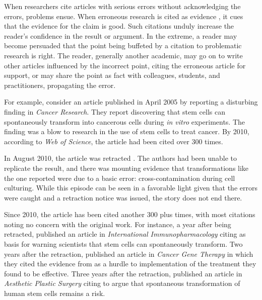 \documentclass[12pt, letterpaper]{article}
\begin{document}
When researchers cite articles with serious errors without acknowledging the errors, problems ensue. When erroneous research is cited as evidence \citep[e.g.,][]{chang2013safety, torsvik2010spontaneous}, it cues that the evidence for the claim is good. Such citations unduly increase the reader's confidence in the result or argument. In the extreme, a reader may become persuaded that the point being buffeted by a citation to problematic research is right. The reader, generally another academic, may go on to write other articles influenced by the incorrect point, citing the erroneous article for support, or may share the point as fact with colleagues, students, and practitioners, propagating the error.

For example, consider an article published in April 2005 by \citet{rubio2005spontaneous} reporting a disturbing finding in \textit{Cancer Research}. They report discovering that stem cells can spontaneously transform into cancerous cells during \textit{in vitro} experiments. The finding was a blow to research in the use of stem cells to treat cancer. By 2010, according to \textit{Web of Science}, the article had been cited over 300 times.

In August 2010, the article was retracted \citep{de2010retraction}. The authors had been unable to replicate the result, and there was mounting evidence that transformations like the one reported were due to a basic error: cross-contamination during cell culturing. While this episode can be seen in a favorable light given that the errors were caught and a retraction notice was issued, the story does not end there.

Since 2010, the article has been cited another 300 plus times, with most citations noting no concern with the original work. For instance, a year after being retracted, \citet{firinci2011mesenchymal} published an article in \textit{International Immunopharmacology} citing \citeauthor{rubio2005spontaneous} as basis for warning scientists that stem cells can spontaneously transform. Two years after the retraction, \citet{kosaka2012therapeutic} published an article in \textit{Cancer Gene Therapy} in which they cited the evidence from \citeauthor{rubio2005spontaneous} as a hurdle to implementation of the treatment they found to be effective. Three years after the retraction, \citet{chang2013safety} published an article in \textit{Aesthetic Plastic Surgery} citing \citeauthor{rubio2005spontaneous} to argue that spontaneous transformation of human stem cells remains a risk.
\end{document}
